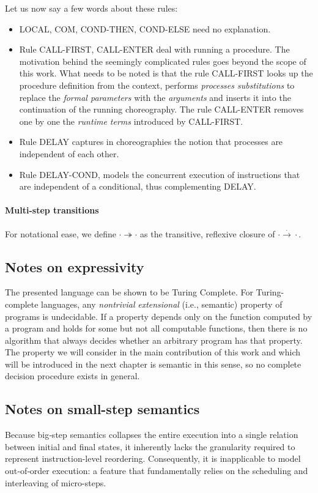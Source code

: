 \documentclass[12pt,a4paper,twoside]{book}
\begin{document}
Let us now say a few words about these rules:
\begin{itemize}
\item LOCAL, COM, COND-THEN, COND-ELSE need no explanation.
\item Rule CALL-FIRST, CALL-ENTER deal with running a procedure. The motivation behind the seemingly complicated rules goes beyond the scope of this work. What needs to be noted is that the rule CALL-FIRST looks up the procedure definition from the context, performs \textit{processes substitutions} to replace the \textit{formal parameters} with the \textit{arguments} and inserts it into the continuation of the running choreography. The rule CALL-ENTER removes one by one the \textit{runtime terms} introduced by CALL-FIRST.
\item Rule DELAY captures in choreographies the notion that processes are independent of each other.
\item Rule DELAY-COND, models the concurrent execution of instructions that are independent of a conditional, thus complementing DELAY.
\end{itemize}

\paragraph{Multi-step transitions}
For notational ease, we define $\cdot \twoheadrightarrow \cdot$ as the transitive, reflexive closure of $\cdot \xrightarrow{.} \cdot$.

\subsection{Notes on expressivity}
The presented language can be shown to be Turing Complete\cite{cruz2020core}.
For Turing-complete languages, any \emph{nontrivial} \emph{extensional} (i.e., semantic) property of programs is undecidable\cite{rice1953classes}. If a property depends only on the function computed by a program and holds for some but not all computable functions, then there is no algorithm that always decides whether an arbitrary program has that property.
The property we will consider in the main contribution of this work and which will be introduced in the next chapter is semantic in this sense, so no complete decision procedure exists in general.

\subsection{Notes on small-step semantics}
Because big‑step semantics collapses the entire execution into a single relation between initial and final states, it inherently lacks the granularity required to represent instruction-level reordering. Consequently, it is inapplicable to model out‑of‑order execution: a feature that fundamentally relies on the scheduling and interleaving of micro-steps.
\end{document}
